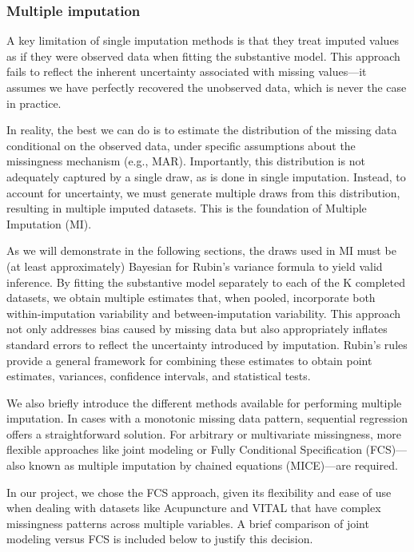 \documentclass{article}
\begin{document}
\subsubsection{Multiple imputation}\label{multiple-imputation}

A key limitation of single imputation methods is that they treat imputed
values as if they were observed data when fitting the substantive model.
This approach fails to reflect the inherent uncertainty associated with
missing values---it assumes we have perfectly recovered the unobserved
data, which is never the case in practice.

In reality, the best we can do is to estimate the distribution of the
missing data conditional on the observed data, under specific
assumptions about the missingness mechanism (e.g., MAR). Importantly,
this distribution is not adequately captured by a single draw, as is
done in single imputation. Instead, to account for uncertainty, we must
generate multiple draws from this distribution, resulting in multiple
imputed datasets. This is the foundation of Multiple Imputation (MI).

As we will demonstrate in the following sections, the draws used in MI
must be (at least approximately) Bayesian for Rubin's variance formula
to yield valid inference. By fitting the substantive model separately to
each of the K completed datasets, we obtain multiple estimates that,
when pooled, incorporate both within-imputation variability and
between-imputation variability. This approach not only addresses bias
caused by missing data but also appropriately inflates standard errors
to reflect the uncertainty introduced by imputation. Rubin's rules
provide a general framework for combining these estimates to obtain
point estimates, variances, confidence intervals, and statistical tests.

We also briefly introduce the different methods available for performing
multiple imputation. In cases with a monotonic missing data pattern,
sequential regression offers a straightforward solution. For arbitrary
or multivariate missingness, more flexible approaches like joint
modeling or Fully Conditional Specification (FCS)---also known as
multiple imputation by chained equations (MICE)---are required.

In our project, we chose the FCS approach, given its flexibility and
ease of use when dealing with datasets like Acupuncture and VITAL that
have complex missingness patterns across multiple variables. A brief
comparison of joint modeling versus FCS is included below to justify
this decision.
\end{document}
